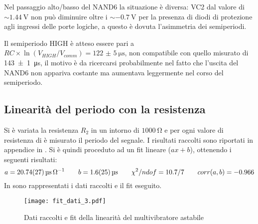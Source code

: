 Nel passaggio alto/basso del NAND6 la situazione è diversa: VC2 dal valore di $\sim \SI{1.44}{\volt}$ non può diminuire oltre i $\sim\SI{-0.7}{\volt}$ per la presenza di diodi di protezione agli ingressi delle porte logiche, a questo è dovuta l'asimmetria dei semiperiodi.

Il semiperiodo HIGH è atteso essere pari a $RC\times \ln(V_{HIGH}/V_{comm}) = \SI{122(5)}{\micro\second}$, non compatibile con quello misurato di \SI{143(1)}{\micro\second}, il motivo è da ricercarsi probabilmente nel fatto che l'uscita del NAND6 non appariva costante ma aumentava leggermente nel corso del semiperiodo.

\subsection{Linearità del periodo con la resistenza}
Si è variata la resistenza $R_2$ in un intorno di $\SI{1000}{\ohm}$ e per ogni valore di resistenza di è misurato il periodo del segnale. I risultati raccolti sono riportati in appendice in .
Si è quindi proceduto ad un fit lineare ($ax+b$), ottenendo i seguenti risultati:
$$a = \SI{20.74(27)}{\micro\second \per \ohm} \qquad b=\SI{1.6 \pm 2.5}{\micro \second} \qquad \chi^2/ndof = 10.7/7 \qquad corr(a,b)= -0.966$$
In  sono rappresentati i dati raccolti e il fit eseguito.

\begin{figure}[h!]
	\centering
	\texttt{[image: fit\_dati\_3.pdf]}
	\caption{Dati raccolti e fit della linearità del multivibratore astabile}
	\label{astab_lin}
\end{figure}

